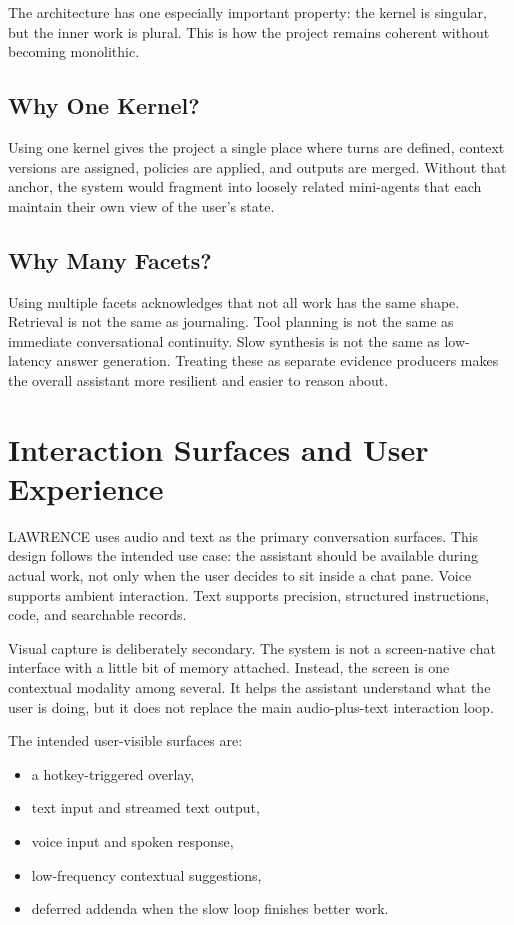 \documentclass[conference]{IEEEtran}
\begin{document}
The architecture has one especially important property: the kernel is singular, but the inner work is plural. This is how the project remains coherent without becoming monolithic.

\subsection{Why One Kernel?}
Using one kernel gives the project a single place where turns are defined, context versions are assigned, policies are applied, and outputs are merged. Without that anchor, the system would fragment into loosely related mini-agents that each maintain their own view of the user's state.

\subsection{Why Many Facets?}
Using multiple facets acknowledges that not all work has the same shape. Retrieval is not the same as journaling. Tool planning is not the same as immediate conversational continuity. Slow synthesis is not the same as low-latency answer generation. Treating these as separate evidence producers makes the overall assistant more resilient and easier to reason about.

\section{Interaction Surfaces and User Experience}
LAWRENCE uses audio and text as the primary conversation surfaces. This design follows the intended use case: the assistant should be available during actual work, not only when the user decides to sit inside a chat pane. Voice supports ambient interaction. Text supports precision, structured instructions, code, and searchable records.

Visual capture is deliberately secondary. The system is not a screen-native chat interface with a little bit of memory attached. Instead, the screen is one contextual modality among several. It helps the assistant understand what the user is doing, but it does not replace the main audio-plus-text interaction loop.

The intended user-visible surfaces are:

\begin{itemize}
\item a hotkey-triggered overlay,
\item text input and streamed text output,
\item voice input and spoken response,
\item low-frequency contextual suggestions,
\item deferred addenda when the slow loop finishes better work.
\end{itemize}
\end{document}
